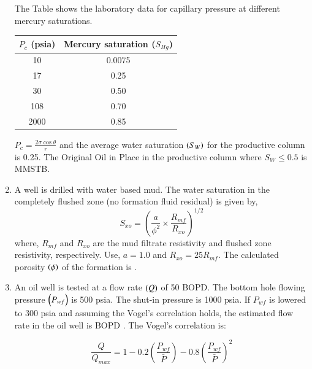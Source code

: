 \documentclass[journal,12pt,onecolumn]{IEEEtran}
\theoremstyle{remark}
\begin{document}
\begin{enumerate}
The Table shows the laboratory data for capillary pressure at different mercury saturations.

\vspace{0.3cm}
\begin{tabular}{|c|c|}
\hline
$P_c$ (psia) & Mercury saturation ($S_{Hg}$) \\
\hline
10 & 0.0075 \\
17 & 0.25 \\
30 & 0.50 \\
108 & 0.70 \\
2000 & 0.85 \\
\hline
\end{tabular}

\vspace{0.3cm}
$P_c = \frac{2\sigma \cos \theta}{r}$ and the average water saturation $\left(S_W\right)$ for the productive column is 0.25. The Original Oil in Place  in the productive column where $S_W \leq 0.5$ is \underline{\hspace{2cm}} MMSTB.  

\hfill{}


\item A well is drilled with water based mud. The water saturation in the completely flushed zone (no formation fluid residual) is given by, 
\[ S_{xo} = \left( \frac{a}{\phi^2} \times \frac{R_{mf}}{R_{xo}} \right)^{1/2} \]
where, $R_{mf}$ and $R_{xo}$ are the mud filtrate resistivity and flushed zone resistivity, respectively. Use, $a = 1.0$ and $R_{xo} = 25 R_{mf}$. 
The calculated porosity $\left(\phi\right)$ of the formation is \underline{\hspace{2cm}}.  

\hfill{}

\item An oil well is tested at a flow rate $\left(Q\right)$ of 50 BOPD. The bottom hole flowing pressure $\left(P_{wf}\right)$ is 500 psia. The shut-in pressure is 1000 psia. If $P_{wf}$ is lowered to 300 psia and assuming the Vogel's correlation holds, the estimated flow rate in the oil well is \underline{\hspace{2cm}} BOPD . The Vogel's correlation is:

\[ \frac{Q}{Q_{max}} = 1 - 0.2\left(\frac{P_{wf}}{\bar{P}}\right) - 0.8\left(\frac{P_{wf}}{\bar{P}}\right)^2 \] \hfill{}
\pagebreak


\end{enumerate}
\end{document}
